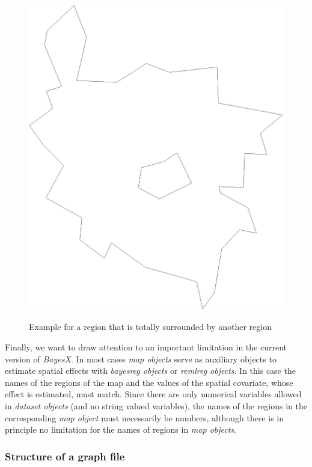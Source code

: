 \begin{figure}[hb]
\centering
\includegraphics [scale=0.3]{grafiken/westin.eps}
{\em\caption{\label{westin} Example for a region that is totally
surrounded by another region}}
\end{figure}



Finally, we want to draw attention to an important limitation in
the current version of {\em BayesX}. In most cases {\em map
objects} serve as auxiliary objects to estimate spatial effects
with {\em bayesreg objects} or {\em remlreg objects}. In this case the names of the regions
of the map and the values of the spatial covariate, whose effect
is estimated, must match. Since there are only numerical variables
allowed in {\em dataset objects} (and no string valued variables),
the names of the regions in the corresponding {\em map object}
must necessarily be numbers, although there is in principle no
limitation for the names of regions in {\em map objects}.

\subsubsection*{Structure of a graph file}

